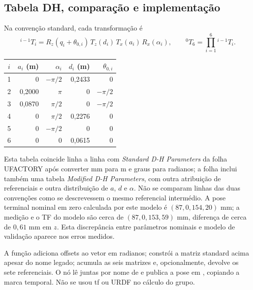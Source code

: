 \subsection{Tabela DH, comparação e implementação}
Na convenção standard, cada transformação é
\begin{equation}
{}^{i-1}T_i=R_z(q_i+\theta_{0,i})\,T_z(d_i)\,T_x(a_i)\,R_x(\alpha_i),
\qquad {}^0T_6=\prod_{i=1}^{6}{}^{i-1}T_i .
\end{equation}
\begin{center}\small
\begin{tabular}{@{}crrrr@{}}\toprule
$i$ & $a_i$ (m) & $\alpha_i$ & $d_i$ (m) & $\theta_{0,i}$\\\midrule
1 & 0 & $-\pi/2$ & 0,2433 & 0\\
2 & 0,2000 & $\pi$ & 0 & $-\pi/2$\\
3 & 0,0870 & $\pi/2$ & 0 & $-\pi/2$\\
4 & 0 & $\pi/2$ & 0,2276 & 0\\
5 & 0 & $-\pi/2$ & 0 & 0\\
6 & 0 & 0 & 0,0615 & 0\\\bottomrule
\end{tabular}
\end{center}
Esta tabela coincide linha a linha com \emph{Standard D-H Parameters} da folha UFACTORY após converter mm para m e graus para radianos; a folha inclui também uma tabela \emph{Modified D-H Parameters}, com outra atribuição de referenciais e outra distribuição de $a$, $d$ e $\alpha$. Não se comparam linhas das duas convenções como se descrevessem o mesmo referencial intermédio. A pose terminal nominal em zero calculada por este modelo é $(87,0,154{,}20)$ mm; a medição e o TF do modelo são cerca de $(87,0,153{,}59)$ mm, diferença de cerca de $0{,}61$ mm em $z$. Esta discrepância entre parâmetros nominais e modelo de validação aparece nos erros medidos.

A função  adiciona offsets ao vetor em radianos;  constrói a matriz standard acima apesar do nome legado;  acumula as seis matrizes e, opcionalmente, devolve os sete referenciais. O nó  lê juntas por nome de  e publica a pose em , copiando a marca temporal. Não se usou tf ou URDF no cálculo do grupo.

